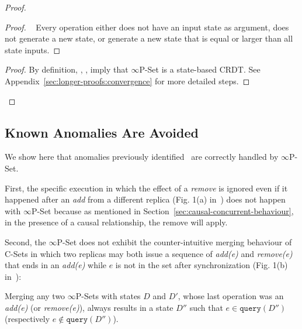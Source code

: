 \documentclass[11pt, oneside]{article}   	%
\begin{document}
\begin{proof}
	
	\begin{proof}
		\pfsketch~ Every operation either does not have an input state as argument, does not generate a new state, or generate a new state that is equal or larger than all state inputs.
	\end{proof}

	\qedstep
	\begin{proof}
		\pf By definition, , ,  imply that $\infty$P-Set is a state-based CRDT. See Appendix~\ref{sec:longer-proofs:convergence} for more detailed steps.
	\end{proof}
\end{proof}


\subsection{Known Anomalies Are Avoided}

We show here that anomalies previously identified~\cite{bieniusa:hal-00769554} are correctly handled by $\infty$P-Set. 

First, the specific execution in which the effect of a \textit{remove} is ignored even if it happened after an \textit{add} from a different replica (Fig. 1(a) in~\cite{bieniusa:hal-00769554}) does not happen with $\infty$P-Set because as mentioned in Section~\ref{sec:causal-concurrent-behaviour}, in the presence of a causal relationship, the remove will apply.

Second,  the $\infty$P-Set does not exhibit the counter-intuitive merging behaviour of C-Sets in which two replicas may both issue a sequence of \textit{add(e)} and \textit{remove(e)} that ends in an \textit{add(e)} while $e$ is not in the set after synchronization (Fig. 1(b) in~\cite{bieniusa:hal-00769554}):

Merging any two $\infty$P-Sets with states $D$ and $D'$, whose last operation was an \textit{add(e)} (or \textit{remove(e)}), always results in a state $D''$ such that $e \in \texttt{query}(D'')$ (respectively $e \notin \texttt{query}(D'')$).
\end{document}
